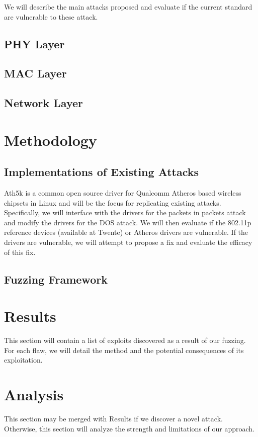 \documentclass[conference]{IEEEtran}
\begin{document}
We will describe the main attacks proposed and evaluate if the current standard are vulnerable to these attack. 



\subsection{PHY Layer}


\subsection{MAC Layer}




\subsection{Network Layer}

\section{Methodology}
\subsection{ Implementations of Existing Attacks}
\label{sec:existing_attacks}
Ath5k is a common open source driver for Qualcomm Atheros based wireless chipsets in Linux and will be the focus for replicating existing attacks. Specifically, we will interface with the drivers for the packets in packets attack and modify the drivers for the DOS attack. We will then evaluate if the 802.11p reference devices (available at Twente) or Atheros drivers are vulnerable. If the drivers are vulnerable, we will attempt to propose a fix and evaluate the efficacy of this fix.\\

\subsection{Fuzzing Framework}


\section{Results}
This section will contain a list of exploits discovered as a result of our fuzzing. For each flaw, we will detail the method and the potential consequences of its exploitation.

\section{Analysis}
This section may be merged with Results if we discover a novel attack. Otherwise, this section will analyze the strength and limitations of our approach.
\end{document}
